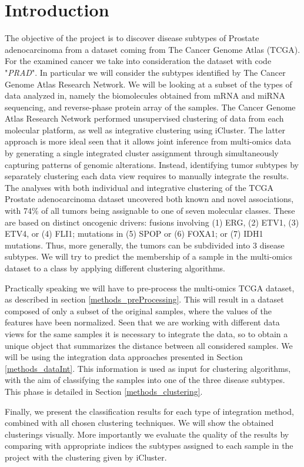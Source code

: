 \chapter{Introduction}\label{introduction}
The objective of the project is to discover disease subtypes of Prostate adenocarcinoma from a dataset coming from The Cancer Genome Atlas (TCGA)\cite{hutter2018TCGA}. For the examined cancer we take into consideration the dataset with code "\textit{PRAD}". In particular we will consider the subtypes identified by The Cancer Genome Atlas Research Network\cite{abeshouse2015molecularPRAD}. We will be looking at a subset of the types of data analyzed in\cite{abeshouse2015molecularPRAD}, namely the biomolecules  obtained from mRNA and miRNA sequencing, and reverse-phase protein array of the samples. The Cancer Genome Atlas Research Network performed unsupervised
clustering of data from each molecular platform, as well as integrative clustering using iCluster\cite{shen2009integrative}. The latter approach is more ideal seen that it allows joint inference from multi-omics data by generating a single integrated cluster assignment through simultaneously capturing patterns of genomic alterations. Instead, identifying tumor subtypes by separately clustering each data view requires to manually integrate the results.
The analyses with both individual and integrative clustering of the TCGA Prostate adenocarcinoma dataset uncovered both known and novel associations, with 74\% of all tumors being assignable to one of seven molecular classes. These are based on distinct oncogenic drivers: fusions involving (1) ERG, (2) ETV1, (3) ETV4, or (4) FLI1; mutations in (5) SPOP
or (6) FOXA1; or (7) IDH1 mutations. Thus, more generally, the tumors can be subdivided into 3 disease subtypes. We will try to predict the membership of a sample in the multi-omics dataset to a class by applying different clustering algorithms.\newline

Practically speaking we will have to pre-process the multi-omics TCGA dataset, as described in section \ref{methods_preProcessing}. This will result in a dataset composed of only a subset of the original samples, where the values of the features have been normalized. Seen that we are working with different data views for the same samples it is necessary to integrate the data, so to obtain a unique object that summarizes the distance between all considered samples. We will be using the integration data approaches presented in Section \ref{methods_dataInt}. This information is used as input for clustering algorithms, with the aim of classifying the samples into one of the three disease subtypes. This phase is detailed in Section \ref{methods_clustering}.

Finally, we present the classification results for each type of integration method, combined with all chosen clustering techniques. We will show the obtained clusterings visually. More importantly we evaluate the quality of the results by comparing with appropriate indices the subtypes assigned to each sample in the project with the clustering given by iCluster.